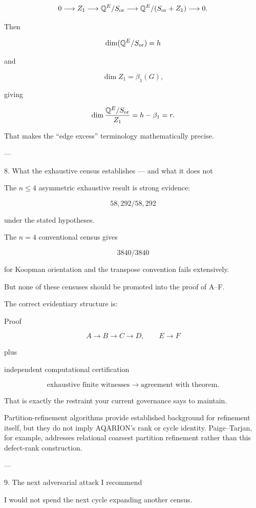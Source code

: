 \[
0  
\longrightarrow Z_1  
\longrightarrow  
\mathbb Q^E/S_{\rm or}  
\longrightarrow  
\mathbb Q^E/(S_{\rm or}+Z_1)  
\longrightarrow0.  
\]

Then

\[
\dim(\mathbb Q^E/S_{\rm or})=h  
\]

and

\[
\dim Z_1=\beta_1(G),  
\]

giving

\[
\dim  
\frac{\mathbb Q^E/S_{\rm or}}{Z_1}  
=  
h-\beta_1  
=  
r.  
\]

That makes the “edge excess” terminology mathematically precise.


---

8. What the exhaustive census establishes — and what it does not



The \(n\le4\) asymmetric exhaustive result is strong evidence:

\[
58,292/58,292  
\]

under the stated hypotheses.

The \(n=4\) conventional census gives

\[
3840/3840  
\]

for Koopman orientation and the transpose convention fails extensively.

But none of these censuses should be promoted into the proof of A–F.

The correct evidentiary structure is:

Proof

\[
A\rightarrow B\rightarrow C\rightarrow D,\qquad  
E\rightarrow F  
\]

plus

independent computational certification

\[
\text{exhaustive finite witnesses}  
\rightarrow  
\text{agreement with theorem}.  
\]

That is exactly the restraint your current governance says to maintain.

Partition-refinement algorithms provide established background for refinement itself, but they do not imply AQARION's rank or cycle identity. Paige–Tarjan, for example, addresses relational coarsest partition refinement rather than this defect-rank construction.


---

9. The next adversarial attack I recommend



I would not spend the next cycle expanding another census.

